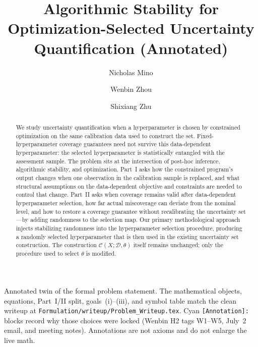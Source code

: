 \documentclass[12pt]{article}
\title{Algorithmic Stability for Optimization-Selected Uncertainty Quantification (Annotated)}
\author[1]{Nicholas Mino}
\author[1]{Wenbin Zhou}
\author[1]{Shixiang Zhu}
\affil[1]{Carnegie Mellon University}
\date{}
\theoremstyle{plain}
\begin{document}
\maketitle
Annotated twin of the formal problem statement.
The mathematical objects, equations, Part~I/II split, goals~(i)--(iii), and symbol table match the clean writeup at
\texttt{Formulation/writeup/Problem\_Writeup.tex}.
Cyan \texttt{[Annotation]:} blocks record why those choices were locked (Wenbin H2 tags W1--W5, July~2 email, and meeting notes).
Annotations are not axioms and do not enlarge the live math.
\begin{abstract}
We study uncertainty quantification when a hyperparameter is chosen by constrained optimization on the same calibration data used to construct the set.
Fixed-hyperparameter coverage guarantees need not survive this data-dependent hyperparameter: the selected hyperparameter is statistically entangled with the assessment sample.
The problem sits at the intersection of post-hoc inference, algorithmic stability, and optimization.
Part~I asks how the constrained program's output changes when one observation in the calibration sample is replaced, and what structural assumptions on the data-dependent objective and constraints are needed to control that change.
Part~II asks when coverage remains valid after data-dependent hyperparameter selection, how far actual miscoverage can deviate from the nominal level, and how to restore a coverage guarantee without recalibrating the uncertainty set---by adding randomness to the selection map.
Our primary methodological approach injects stabilizing randomness into the hyperparameter selection procedure, producing a randomly selected hyperparameter that is then used in the existing uncertainty set construction.
The construction $\mathcal{C}(X;\mathcal{D},\theta)$ itself remains unchanged; only the procedure used to select $\theta$ is modified.
\end{abstract}

\begin{center}
\end{center}
\end{document}
